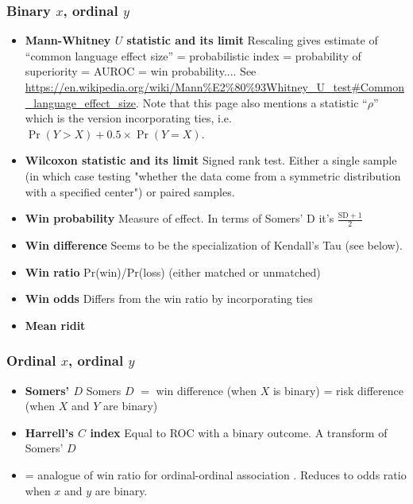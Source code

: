 \documentclass[
  11pt,
  fleqn
]{article}
\begin{document}
\subsubsection{Binary $x$, ordinal $y$}

\begin{itemize}
  \item \textbf{Mann-Whitney $U$ statistic and its limit} Rescaling
    gives estimate of ``common language effect size'' = probabilistic
    index = probability of superiority = AUROC = win probability.... See
    \url{https://en.wikipedia.org/wiki/Mann%E2%80%93Whitney_U_test#Common_language_effect_size}.
      Note that this page also mentions a statistic ``$\rho$''
      which is the version incorporating ties, i.e.~$\Pr(Y > X) +
      0.5 \times \Pr(Y = X)$.
    \item \textbf{Wilcoxon statistic and its limit} Signed rank test. Either a
      single sample (in which case testing "whether the data come from
      a symmetric distribution with a specified center") or paired samples.
    \item \textbf{Win probability} Measure of effect. In terms of
      Somers' D it's
      $\frac{\text{SD} + 1}{2}$
    \item \textbf{Win difference} Seems to be the specialization of
      Kendall's Tau (see below).
    \item \textbf{Win ratio} Pr(win)/Pr(loss) (either matched or unmatched)
    \item \textbf{Win odds} Differs from the win ratio by incorporating ties
    \item \textbf{Mean ridit}
  \end{itemize}

  \subsubsection{Ordinal $x$, ordinal $y$}

  \begin{itemize}
    \item \textbf{Somers' $D$} \citep{newsonInterpretationSomersFour,
      newsonParametersNonparametricStatistics2002} Somers $D$ $=$ win
      difference (when $X$ is binary) = risk difference (when $X$ and
      $Y$ are binary)
    \item \textbf{Harrell's $C$ index} Equal to ROC with a binary outcome. A
      transform of Somers' $D$
    \item {} = analogue of win
      ratio for ordinal-ordinal association
      \citet{newsonParametersNonparametricStatistics2002}. Reduces to
      odds ratio when $x$ and $y$ are binary.
  \end{itemize}
\end{document}
